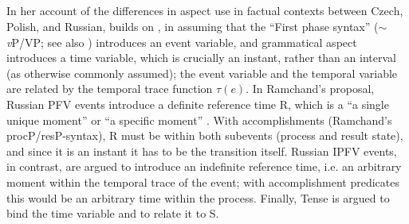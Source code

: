 \documentclass[output=paper,colorlinks,citecolor=brown]{langscibook}
\begin{document}
\subsection{\citet{klimek22}}
\label{sec:klimek}

In her account of the differences in aspect use in factual contexts between Czech, Polish, and Russian, \citet{klimek22} builds on \citet{Ramchand2004,ramchandlingua}, in assuming that the ``First phase syntax'' ($\sim$ \textit{v}P/VP; see also ) introduces an event variable, and grammatical aspect introduces a time variable, which is crucially an instant, rather than an interval (as otherwise commonly assumed); the event variable and the temporal variable are related by the temporal trace function $\tau(e)$. In Ramchand's proposal, Russian PFV events introduce a definite reference time R, which is a  ``a single unique moment'' \citep[][]{Ramchand2004} or ``a specific moment'' \citep[][]{ramchandlingua}. With accomplishments (Ramchand's procP/resP-syntax), R must be within both subevents (process and result state), and since it is an instant it has to be the transition itself. Russian IPFV events, in contrast, are argued to introduce an indefinite reference time, i.e. an arbitrary moment within the temporal trace of the event; with accomplishment predicates this would be an arbitrary time within the process. Finally, Tense is argued to bind the time variable and to relate it to S. 
\end{document}
